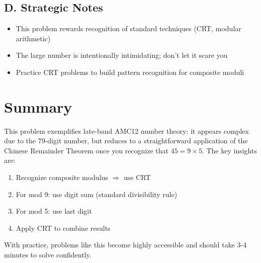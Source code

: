 \documentclass[11pt]{article}
\begin{document}
\begin{competitionbox}
\subsection*{D. Strategic Notes}
\begin{itemize}[leftmargin=*]
    \item This problem rewards recognition of standard techniques (CRT, modular arithmetic)
    \item The large number is intentionally intimidating; don't let it scare you
    \item Practice CRT problems to build pattern recognition for composite moduli
\end{itemize}
\end{competitionbox}

\section*{Summary}

This problem exemplifies late-band AMC12 number theory: it appears complex due to the 79-digit number, but reduces to a straightforward application of the Chinese Remainder Theorem once you recognize that $45 = 9 \times 5$. The key insights are:
\begin{enumerate}
    \item Recognize composite modulus $\Rightarrow$ use CRT
    \item For mod 9: use digit sum (standard divisibility rule)
    \item For mod 5: use last digit
    \item Apply CRT to combine results
\end{enumerate}

With practice, problems like this become highly accessible and should take 3-4 minutes to solve confidently.
\end{document}
